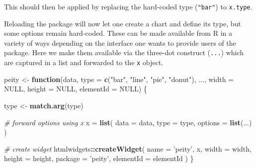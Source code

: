 \documentclass[10pt,]{krantz}
\makeatletter
\newenvironment{Shaded}{\begin{snugshade}}{\end{snugshade}}
\newcommand{\AttributeTok}[1]{\textcolor[rgb]{0.61,0.61,0.61}{#1}}
\newcommand{\CommentTok}[1]{\textcolor[rgb]{0.37,0.37,0.37}{\textit{#1}}}
\newcommand{\ControlFlowTok}[1]{\textcolor[rgb]{0.27,0.27,0.27}{\textbf{#1}}}
\newcommand{\DataTypeTok}[1]{\textcolor[rgb]{0.27,0.27,0.27}{#1}}
\newcommand{\KeywordTok}[1]{\textcolor[rgb]{0.27,0.27,0.27}{\textbf{#1}}}
\newcommand{\NormalTok}[1]{#1}
\newcommand{\OperatorTok}[1]{\textcolor[rgb]{0.43,0.43,0.43}{\textbf{#1}}}
\newcommand{\OtherTok}[1]{\textcolor[rgb]{0.37,0.37,0.37}{#1}}
\newcommand{\StringTok}[1]{\textcolor[rgb]{0.5,0.5,0.5}{#1}}
\newcommand{\VariableTok}[1]{\textcolor[rgb]{0,0,0}{#1}}
\newenvironment{kframe}{%
\medskip{}
\setlength{\fboxsep}{.8em}
 \def\at@end@of@kframe{}%
 \ifinner\ifhmode%
  \def\at@end@of@kframe{\end{minipage}}%
  \begin{minipage}{\columnwidth}%
 \fi\fi%
 \def\FrameCommand##1{\hskip\@totalleftmargin \hskip-\fboxsep
 \colorbox{shadecolor}{##1}\hskip-\fboxsep
     \hskip-\linewidth \hskip-\@totalleftmargin \hskip\columnwidth}%
 \MakeFramed {\advance\hsize-\width
   \@totalleftmargin\z@ \linewidth\hsize
   \@setminipage}}%
 {\par\unskip\endMakeFramed%
 \at@end@of@kframe}
\renewenvironment{Shaded}{\begin{kframe}}{\end{kframe}}
\makeatother
\begin{document}
This should then be applied by replacing the hard-coded type (\texttt{"bar"}) to \texttt{x.type}.

\begin{Shaded}
\end{Shaded}

Reloading the package will now let one create a chart and define its type, but some options remain hard-coded. These can be made available from R in a variety of ways depending on the interface one wants to provide users of the package. Here we make them available via the three-dot construct (\texttt{...}) which are captured in a list and forwarded to the \texttt{x} object.

\begin{Shaded}
\begin{Highlighting}[]
\NormalTok{peity <-}\StringTok{ }\ControlFlowTok{function}\NormalTok{(data, }\DataTypeTok{type =} \KeywordTok{c}\NormalTok{(}\StringTok{"bar"}\NormalTok{, }\StringTok{"line"}\NormalTok{, }\StringTok{"pie"}\NormalTok{, }\StringTok{"donut"}\NormalTok{), }
\NormalTok{  ..., }\DataTypeTok{width =} \OtherTok{NULL}\NormalTok{, }\DataTypeTok{height =} \OtherTok{NULL}\NormalTok{, }\DataTypeTok{elementId =} \OtherTok{NULL}\NormalTok{) \{}

\NormalTok{  type <-}\StringTok{ }\KeywordTok{match.arg}\NormalTok{(type)}

  \CommentTok{# forward options using x}
\NormalTok{  x =}\StringTok{ }\KeywordTok{list}\NormalTok{(}
    \DataTypeTok{data =}\NormalTok{ data,}
    \DataTypeTok{type =}\NormalTok{ type,}
    \DataTypeTok{options =} \KeywordTok{list}\NormalTok{(...)}
\NormalTok{  )}

  \CommentTok{# create widget}
\NormalTok{  htmlwidgets}\OperatorTok{::}\KeywordTok{createWidget}\NormalTok{(}
    \DataTypeTok{name =} \StringTok{'peity'}\NormalTok{,}
\NormalTok{    x,}
    \DataTypeTok{width =}\NormalTok{ width,}
    \DataTypeTok{height =}\NormalTok{ height,}
    \DataTypeTok{package =} \StringTok{'peity'}\NormalTok{,}
    \DataTypeTok{elementId =}\NormalTok{ elementId}
\NormalTok{  )}
\NormalTok{\}}
\end{Highlighting}
\end{Shaded}
\end{document}

